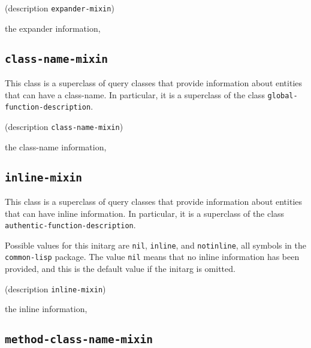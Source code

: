 {\footnotesize
{}
}

{\footnotesize
{} {(description {\tt expander-mixin})}
}

 the expander information, 

\subsection{\texttt{class-name-mixin}}
\label{sec-class-name-mixin}

{\footnotesize
{}
}

This class is a superclass of query classes that provide information
about entities that can have a class-name.  In particular, it is a
superclass of the class \texttt{global-function-description}.

{\footnotesize
{}
}

{\footnotesize
{} {(description {\tt class-name-mixin})}
}

 the class-name information, 

\subsection{\texttt{inline-mixin}}
\label{sec-inline-mixin}

{\footnotesize
{}
}

This class is a superclass of query classes that provide information
about entities that can have inline information.  In particular, it is a
superclass of the class \texttt{authentic-function-description}.

{\footnotesize
{}
}

Possible values for this initarg are \texttt{nil}, \texttt{inline},
and \texttt{notinline}, all symbols in the \texttt{common-lisp}
package.  The value \texttt{nil} means that no inline information has
been provided, and this is the default value if the initarg is omitted.

{\footnotesize
{} {(description {\tt inline-mixin})}
}

 the inline information, 

\subsection{\texttt{method-class-name-mixin}}
\label{sec-method-class-name-mixin}


